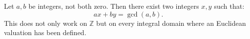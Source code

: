 \documentclass[12pt]{article}
\begin{document}
Let $a,b$ be integers, not both zero. Then there exist two integers $x,y$ such that:
$$ax+by=\gcd(a,b).$$
This does not only work on $\mathbb{Z}$ but on every integral domain where an Euclidean valuation has been defined.
\end{document}

